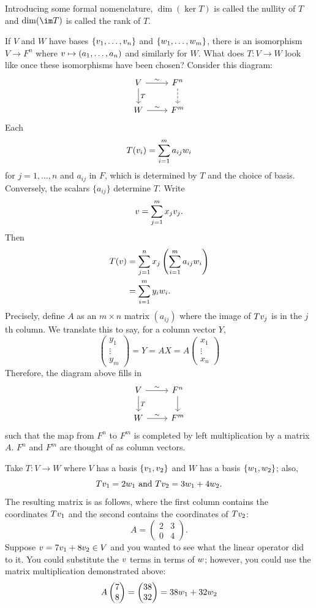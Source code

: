 \documentclass[11pt, oneside]{amsart}
\numberwithin{equation}{section}
\numberwithin{theorem}{section}
\theoremstyle{definition}
\let\bf\relax
\begin{document}
Introducing some formal nomenclature, $\dim(\ker T)$ is called the nullity of $T$ and $\dim(\im T)$ is called the rank of $T$.

If $V$ and $W$ have bases $\{\bf v_1,\hdots,\bf v_n\}$ and $\{\bf w_1,\hdots,\bf w_m\}$, there is an isomorphism $V\to F^n$ where $\bf v \mapsto (a_1,\hdots, a_n)$ and similarly for $W$. What does $T:V\to W$ look like once these isomorphisms have been chosen? Consider this diagram:
$$
 \begin{tikzcd}[]
V\arrow{r}{\sim} \arrow{d}{T} & F^n\arrow[dashed]{d} \\
W\arrow{r}{\sim} & F^m
\end{tikzcd}
$$
Each 
$$
T(\bf v_i) = \sum_{i=1}^ma_{ij}\bf w_i
$$
for $j=1,\hdots, n$ and $a_{ij}$ in $F$, which is determined by $T$ and the choice of basis. Conversely, the scalars $\{a_{ij}\}$ determine $T$. Write 
$$
\bf v = \sum _{j=1}^m x_j\bf v_j.
$$
Then
\begin{align*}
T(\bf v) &= \sum_{j=1}^n x_j\left(\sum_{i=1}^m a_{ij}\bf{w}_i\right)\\
	    &= \sum_{i=1}^m y_i\bf{w}_i.
\end{align*}
Precisely, define $A$ as an $m\times n$ matrix $(a_{ij})$ where the image of  $T\bf v_j$ is in the $j$th column. We translate this to say, for a column vector $Y$,
$$
\left(\begin{matrix}y_1\\\vdots\\y_m\end{matrix}\right) = Y = AX = A \left(\begin{matrix}x_1\\\vdots\\x_n\end{matrix}\right)
$$
Therefore, the diagram above fills in
$$
\begin{tikzcd}
V\arrow{r}{\sim} \arrow{d}{T} & F^n\arrow[]{d} \\
W\arrow{r}{\sim} & F^m
\end{tikzcd}
$$
such that the map from $F^n$ to $F^m$ is completed by left multiplication by a matrix $A$. $F^n$ and $F^m$ are thought of as column vectors. 

Take $T: V\to W$ where $V$ has a basis $\{\bf v_1,\bf v_2\}$ and $W$ has a basis $\{\bf w_1,\bf w_2\}$; also, $$T\bf{v}_1 = 2\bf w_1 \textrm{ and } T\bf{v}_2 = 3\bf w_1 + 4\bf w_2.$$ The resulting matrix is as follows, where the first column contains the coordinates $T\bf v_1$ and the second contains the coordinates of $T\bf v_2$:
$$
A = \begin{pmatrix} 2 & 3 \\ 0 & 4\end{pmatrix}.
$$
Suppose $\bf{v} = 7\bf v_1 + 8 \bf v_2 \in V$ and you wanted to see what the linear operator did to it. You could substitute the $\bf v$ terms in terms of $\bf w$; however, you could use the matrix multiplication demonstrated above:
$$
A\left(\begin{matrix}7\\8\end{matrix}\right) = \left(\begin{matrix}38\\32\end{matrix}\right) = 38 \bf w_1 + 32 \bf w_2
$$
\end{document}
